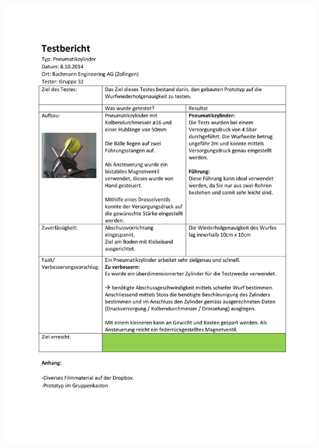   	 \includegraphics[page=1,width=\textwidth]{Funktionstests/Pneumatikzylinder.pdf}
  	 \newpage
  	 
